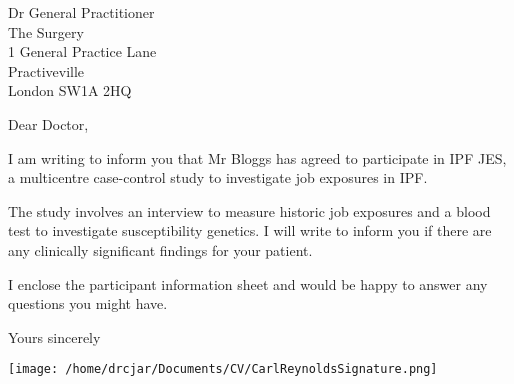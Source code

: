 \documentclass[ipfjes,letterpaper,pagesize,UScommercial9]{scrlttr2}
\begin{document}
\begin{letter}{Dr General Practitioner \\ The Surgery \\ 1 General Practice Lane \\ Practiveville \\ London SW1A 2HQ}


\opening{Dear Doctor,}

    I am writing to inform you that Mr Bloggs has agreed to participate in IPF JES, a multicentre case-control study to investigate job exposures in IPF.
    
    The study involves an interview to measure historic job exposures and a blood test to investigate susceptibility genetics. I will write to inform you if there are any clinically significant findings for your patient. 
    
    I enclose the participant information sheet and would be happy to answer any questions you might have.




\closing{Yours sincerely}

    \texttt{[image: /home/drcjar/Documents/CV/CarlReynoldsSignature.png]}

\end{letter}
\end{document}
